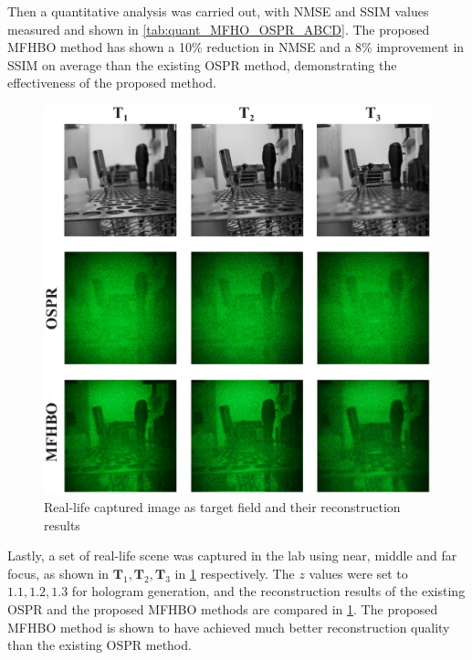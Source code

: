 	Then a quantitative analysis was carried out, with NMSE and SSIM values measured and shown in \cref{tab:quant_MFHO_OSPR_ABCD}. The proposed MFHBO method has shown a 10\% reduction in NMSE and a 8\% improvement in SSIM on average than the existing OSPR method, demonstrating the effectiveness of the proposed method. 
	
	
	\begin{figure}[h!t]
		\centering
		\includegraphics[width=1.0\textwidth]{MFHO_OSPR_Pen_holder.pdf}
		\caption{Real-life captured image as target field and their reconstruction results}
		\label{fig:MFHO_OSPR_Pen_holder}
	\end{figure}
	
	Lastly, a set of real-life scene was captured in the lab using near, middle and far focus, as shown in $\textbf{T}_1, \textbf{T}_2, \textbf{T}_3$ in \cref{fig:MFHO_OSPR_Pen_holder} respectively. The $z$ values were set to $1.1, 1.2, 1.3$ for hologram generation, and the reconstruction results of the existing OSPR and the proposed MFHBO methods are compared in \cref{fig:MFHO_OSPR_Pen_holder}. The proposed MFHBO method is shown to have achieved much better reconstruction quality than the existing OSPR method.
	
